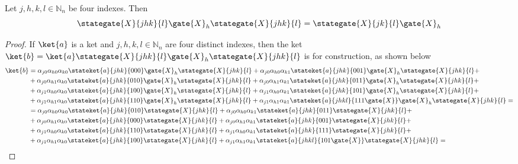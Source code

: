 \begin{proposition}
    Let $j,h,k,l \in \mathbb{N}_n$ be four indexes.
    Then
    \begin{equation}
        \label{eq:mainresult}
        \stategate{X}{jhk}{l}\gate{X}_h\stategate{X}{jhk}{l} = \stategate{X}{jk}{l}\gate{X}_h
    \end{equation}
\end{proposition}
\begin{proof}
    If $\ket{a}$ is a ket and $j,h,k,l \in \mathbb{N}_n$ are four distinct indexes, then
    the ket
    $\ket{b}=\ket{a}\stategate{X}{jhk}{l}\gate{X}_h\stategate{X}{jhk}{l}$
    is for construction, as shown below
    \begin{align*}
        \ket{b}
        &=\alpha_{j0}\alpha_{h0}\alpha_{k0}\stateket{a}{jhk}{000}\gate{X}_h\stategate{X}{jhk}{l} +
          \alpha_{j0}\alpha_{h0}\alpha_{k1}\stateket{a}{jhk}{001}\gate{X}_h\stategate{X}{jhk}{l}+\\
        &+\alpha_{j0}\alpha_{h1}\alpha_{k0}\stateket{a}{jhk}{010}\gate{X}_h\stategate{X}{jhk}{l} +
          \alpha_{j0}\alpha_{h1}\alpha_{k1}\stateket{a}{jhk}{011}\gate{X}_h\stategate{X}{jhk}{l}+\\
        &+\alpha_{j1}\alpha_{h0}\alpha_{k0}\stateket{a}{jhk}{100}\gate{X}_h\stategate{X}{jhk}{l} +
          \alpha_{j1}\alpha_{h0}\alpha_{k1}\stateket{a}{jhk}{101}\gate{X}_h\stategate{X}{jhk}{l}+\\
        &+\alpha_{j1}\alpha_{h1}\alpha_{k0}\stateket{a}{jhk}{110}\gate{X}_h\stategate{X}{jhk}{l} +
          \alpha_{j1}\alpha_{h1}\alpha_{k1}\stateket{a}{jhkl}{111\gate{X}}\gate{X}_h\stategate{X}{jhk}{l}=\\
        &=\alpha_{j0}\alpha_{h0}\alpha_{k0}\stateket{a}{jhk}{010}\stategate{X}{jhk}{l} +
          \alpha_{j0}\alpha_{h0}\alpha_{k1}\stateket{a}{jhk}{011}\stategate{X}{jhk}{l}+\\
        &+\alpha_{j0}\alpha_{h1}\alpha_{k0}\stateket{a}{jhk}{000}\stategate{X}{jhk}{l} +
          \alpha_{j0}\alpha_{h1}\alpha_{k1}\stateket{a}{jhk}{001}\stategate{X}{jhk}{l}+\\
        &+\alpha_{j1}\alpha_{h0}\alpha_{k0}\stateket{a}{jhk}{110}\stategate{X}{jhk}{l} +
          \alpha_{j1}\alpha_{h0}\alpha_{k1}\stateket{a}{jhk}{111}\stategate{X}{jhk}{l}+\\
        &+\alpha_{j1}\alpha_{h1}\alpha_{k0}\stateket{a}{jhk}{100}\stategate{X}{jhk}{l} +
          \alpha_{j1}\alpha_{h1}\alpha_{k1}\stateket{a}{jhkl}{101\gate{X}}\stategate{X}{jhk}{l}=\\

\end{align*}
\end{proof}
